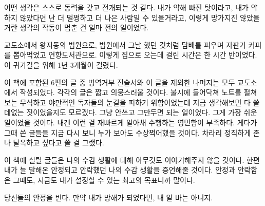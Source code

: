 \begin{article}
어떤 생각은 스스로 동력을 갖고 전개되는 것 같다. 내가 약해 빠진 탓이라고, 내가 약하지 않았다면 난 더 멀쩡하고 더 나은 사람일 수 있을거라고, 이렇게 망가지진 않았을거란 생각의 작동이 멈춘 건 얼마 전의 일이었다.

교도소에서 왕지동의 법원으로, 법원에서 그날 했던 것처럼 담배를 피우며 자판기 커피를 뽑아먹었고 연향도서관으로. 이렇게 집으로 오는데 걸린 시간은 한 시간 반이었다. 이 귀가길을 위해 1년 3개월이 걸렸다.

이 책에 포함된 6편의 글 중 병역거부 진술서와 이 글을 제외한 나머지는 모두 교도소에서 작성되었다. 각각의 글은 짧고 의뭉스러울 것이다. 불시에 들어닥쳐 노트를 펼쳐보는 무식하고 야만적인 독자들의 눈길을 피하기 위함이었는데 지금 생각해보면 다 쓸데없는 짓이었을지도 모르겠다. 그냥 안쓰고 그만두면 되는 일이었다. 그게 가장 쉬운 일이었을 것이다. 내겐 이런 걸 재빠르게 알아채 수행하는 영민함이 부족하다. 게다가 그때 쓴 글들을 지금 다시 보니 누가 보아도 수상쩍어했을 것이다. 차라리 정직하게 존나 탈옥하고 싶다고 쓸 걸 그랬다.

이 책에 실릴 글들은 나의 수감 생활에 대해 아무것도 이야기해주지 않을 것이다. 한편 내가 늘 말해온 안정되고 안락했던 나의 수감 생활을 증언해줄 것이다. 안정과 안락함은 그때도, 지금도 내가 설정할 수 있는 최고의 목표니까 말이다.

당신들의 안정을 빈다. 만약 내가 방해가 되었다면, 내 알 바는 아니지.
\end{article}
